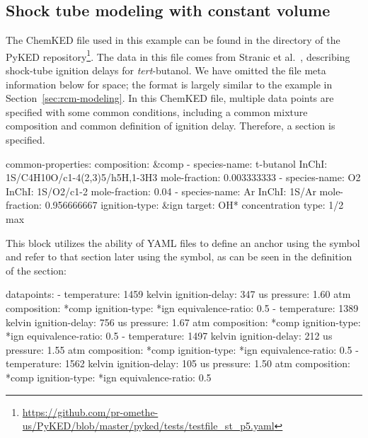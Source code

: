 \documentclass[12pt]{ussci}
\newcommand\ck{ChemKED}
\newcommand\pk{PyKED}
\begin{document}
\subsection{Shock tube modeling with constant volume}\label{sec:shock-tube}

The \ck{} file used in this example can be found in the  directory of the \pk{}
repository\footnote{\url{https://github.com/pr-omethe-us/PyKED/blob/master/pyked/tests/testfile_st_p5.yaml}}.
The data in this file comes from Stranic et al.~\autocite{Stranic:2012}, describing
shock-tube ignition delays for \textit{tert}-butanol. We have omitted the file
meta information below for space; the format is largely similar to the example in Section~\ref{sec:rcm-modeling}.
%
In this \ck{} file, multiple data points are specified with some common
conditions, including a common mixture composition and common definition of
ignition delay. Therefore, a  section is specified.
%
\begin{yamlbox}
common-properties:
  composition: &comp
    - species-name: t-butanol
      InChI: 1S/C4H10O/c1-4(2,3)5/h5H,1-3H3
      mole-fraction: 0.003333333
    - species-name: O2
      InChI:  1S/O2/c1-2
      mole-fraction: 0.04
    - species-name: Ar
      InChI:  1S/Ar
      mole-fraction: 0.956666667
  ignition-type:  &ign
    target: OH* concentration
    type: 1/2 max
\end{yamlbox}
%
This block utilizes the ability of YAML files to define an anchor using the
\yabox{&} symbol and refer to that section later using the \yabox{*} symbol, as
can be seen in the definition of the  section:
%
\begin{yamlbox}
datapoints:
  - temperature: 1459 kelvin
    ignition-delay: 347 us
    pressure: 1.60 atm
    composition: *comp
    ignition-type: *ign
    equivalence-ratio: 0.5
  - temperature: 1389 kelvin
    ignition-delay: 756 us
    pressure: 1.67 atm
    composition: *comp
    ignition-type: *ign
    equivalence-ratio: 0.5
  - temperature: 1497 kelvin
    ignition-delay: 212 us
    pressure: 1.55 atm
    composition: *comp
    ignition-type: *ign
    equivalence-ratio: 0.5
  - temperature: 1562 kelvin
    ignition-delay: 105 us
    pressure: 1.50 atm
    composition: *comp
    ignition-type: *ign
    equivalence-ratio: 0.5
\end{yamlbox}
\end{document}

